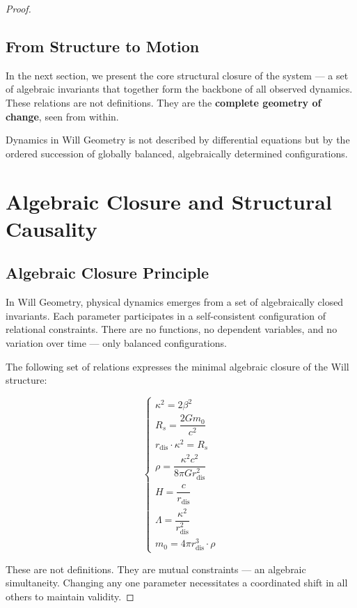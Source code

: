 \documentclass{article}
\begin{document}
\begin{theorem}
\begin{proof}
\subsection*{From Structure to Motion}

In the next section, we present the core structural closure of the system ---  
a set of algebraic invariants that together form the backbone of all observed dynamics.  
These relations are not definitions.  
They are the \textbf{complete geometry of change}, seen from within.

\begin{tcolorbox}[colback=gray!5, colframe=black!80!black, title=Dynamics in Will Geometry]
Dynamics in Will Geometry is not described by differential equations
but by the ordered succession of globally balanced, algebraically determined configurations.
\end{tcolorbox}

\section{Algebraic Closure and Structural Causality}

\subsection*{Algebraic Closure Principle}

In Will Geometry, physical dynamics emerges from a set of algebraically closed invariants.  
Each parameter participates in a self-consistent configuration of relational constraints.  
There are no functions, no dependent variables, and no variation over time --- only balanced configurations.

The following set of relations expresses the minimal algebraic closure of the Will structure:

\[
\begin{cases}
\kappa^2 = 2 \beta^2 \\
R_s = \dfrac{2G m_0}{c^2} \\
r_{\text{dis}} \cdot \kappa^2 = R_s \\
\rho = \dfrac{\kappa^2 c^2}{8\pi G r_{\text{dis}}^2} \\
H = \dfrac{c}{r_{\text{dis}}} \\
\Lambda = \dfrac{\kappa^2}{r_{\text{dis}}^2} \\
m_0 = 4\pi r_{\text{dis}}^3 \cdot \rho
\end{cases}
\]

These are not definitions.  
They are mutual constraints --- an algebraic simultaneity.  
Changing any one parameter necessitates a coordinated shift in all others to maintain validity.


\end{proof}
\end{theorem}
\end{document}
